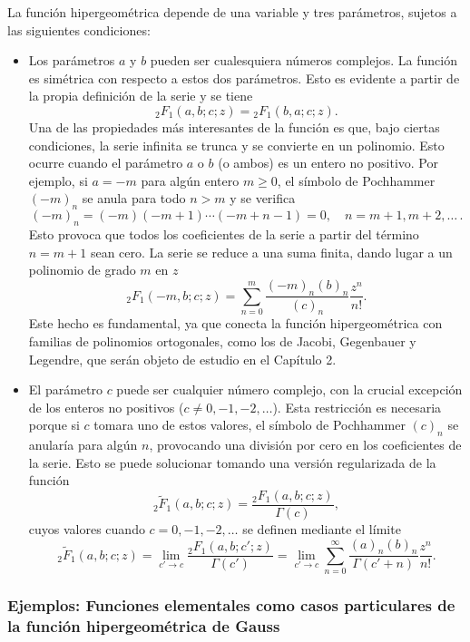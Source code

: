 \documentclass[12pt,a4paper]{book}
\begin{document}
La función hipergeométrica depende de una variable y tres parámetros, sujetos a las siguientes condiciones:
\begin{itemize}

    \item Los parámetros $a$ y $b$ pueden ser cualesquiera números complejos. La función es simétrica con respecto a estos dos parámetros. Esto es evidente a partir de la propia definición de la serie y se tiene
    \[
    {}_{2}F_{1}(a,b;c;z) = {}_{2}F_{1}(b,a;c;z).
    \]
    Una de las propiedades más interesantes de la función es que, bajo ciertas condiciones, la serie infinita se trunca y se convierte en un polinomio. Esto ocurre cuando el parámetro $a$ o $b$ (o ambos) es un entero no positivo.
    Por ejemplo, si $a = -m$ para algún entero $m \geq 0$, el símbolo de Pochhammer $(-m)_n$ se anula para todo $n > m$ y se verifica
    \[ (-m)_n = (-m)(-m+1)\cdots(-m+n-1) = 0, \quad  n=m+1, m+2, \dots\,.\]
    Esto provoca que todos los coeficientes de la serie a partir del término $n=m+1$ sean cero. La serie se reduce a una suma finita, dando lugar a un polinomio de grado $m$ en $z$
    \[
    {}_{2}F_{1}(-m,b;c;z) = \sum_{n=0}^{m} \frac{(-m)_n (b)_n}{(c)_n} \frac{z^n}{n!}.
    \]
    Este hecho es fundamental, ya que conecta la función hipergeométrica con familias de polinomios ortogonales, como los de Jacobi, Gegenbauer y Legendre, que serán objeto de estudio en el Capítulo 2.
    \item El parámetro $c$ puede ser cualquier número complejo, con la crucial excepción de los enteros no positivos ($c \neq 0, -1, -2, \dots$). Esta restricción es necesaria porque si $c$ tomara uno de estos valores, el símbolo de Pochhammer $(c)_n$ se anularía para algún $n$, provocando una división por cero en los coeficientes de la serie. Esto se puede solucionar tomando una versión regularizada de la función
    \[
    {}_{2}\tilde{F}_{1}(a,b;c;z) =
    \frac{{}_{2}F_{1}(a,b;c;z)}{\Gamma(c)}, 
    \]
    cuyos valores cuando \(c = 0,-1,-2,\dots\) se definen mediante el límite
    \[
    {}_{2}\tilde{F}_{1}(a,b;c;z) =
    \lim_{c' \to c} \frac{{}_{2}F_{1}(a,b;c';z)}{\Gamma(c')} = \lim_{c' \to c} \sum_{n=0}^{\infty} \frac{(a)_n (b)_n}{\Gamma(c'+n)} \frac{z^n}{n!}.
    \]
\end{itemize}

\subsubsection*{Ejemplos: Funciones elementales como casos particulares de la función hipergeométrica de Gauss}
\end{document}
